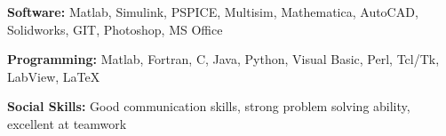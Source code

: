 \documentclass[9pt]{extarticle}
\begin{document}


\begin{description}[itemsep=-3pt,leftmargin=30.5pt,itemindent=-2em]
\item[] \textbf{Software:} Matlab, Simulink, PSPICE, Multisim, Mathematica, AutoCAD, Solidworks, GIT, Photoshop, MS Office
\item[] \textbf{Programming:} Matlab, Fortran, C, Java, Python, Visual Basic, Perl, Tcl/Tk, LabView, LaTeX
\item[] \textbf{Social Skills:} Good communication skills, strong problem solving ability, excellent at teamwork
\end{description}
\end{document}
